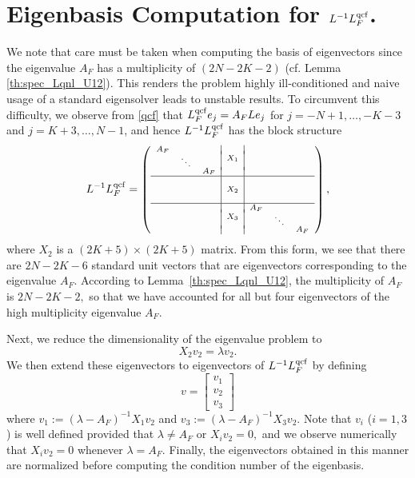 \documentclass[12pt,reqno]{amsart}
\begin{document}
\section{Eigenbasis Computation for ${{L}}^{-1} {L^{{\rm qcf}}_F}$.}
\label{app:cond_calc}
We note that care must be taken when computing the basis of
eigenvectors since the eigenvalue $A_F$ has a multiplicity of
$(2N-2K-2)$ (cf. Lemma \ref{th:spec_Lqnl_U12}). This renders the
problem highly ill-conditioned and naive usage of a standard
eigensolver leads to unstable results. To circumvent this difficulty,
we observe from \eqref{qcf} that ${L^{{\rm qcf}}_F} e_j=A_F{{L}} e_j$ for
$j=-N+1,\dots, -K-3$ and $j= K+3,\dots, N-1$, and hence
${{L}}^{-1}{L^{{\rm qcf}}_F}$ has the block structure
\begin{equation*}
    {{L}}^{-1}{L^{{\rm qcf}}_F} = {\scriptsize \left(\begin{array}{rrr|r|rrr}
    A_F &      &     & \multirow{3}{*}{${X_1}$} &     &      &   \\[-1mm]
        &\ddots&     &      &   &      &   \\[-1mm]
        &      & A_F &      &   &      &   \\
      \hline
        &      &     & \multirow{3}{*}{${X_2}$} &     &      &   \\
	&      &     &   &   &      &   \\
	&      &     &   &   &      &   \\
      \hline
        &      &     & \multirow{3}{*}{${X_3}$} & A_F &      &   \\[-1mm]
        &      &     &     &     &\ddots&   \\[-1mm]
        &      &     &     &     &      & A_F
    \end{array} \right), }
\end{equation*}
where $X_2$ is a $(2K+5) \times (2K+5)$ matrix.  From this form, we
see that there are $2N-2K-6$ standard unit vectors that are
eigenvectors corresponding to the eigenvalue $A_F.$ According to
Lemma~\ref{th:spec_Lqnl_U12}, the multiplicity of $A_F$ is $2N-2K-2,$
so that we have accounted for all but four eigenvectors of the high
multiplicity eigenvalue $A_F.$

Next, we reduce the dimensionality of the eigenvalue problem to
\begin{equation*}
  X_2 v_2 = \lambda v_2.
\end{equation*}
We then extend these eigenvectors to eigenvectors of ${{L}}^{-1} {L^{{\rm qcf}}_F}$
by defining
\begin{equation*}
  v = \left[
    \begin{array}{c}
      v_1\\
      v_2\\
      v_3
    \end{array}
  \right]
\end{equation*}
where $v_1:=(\lambda-A_F)^{-1}X_1 v_2$ and $v_3:=(\lambda-A_F)^{-1}X_3
v_2.$ Note that $v_i$ ($i=1,3$) is well defined provided that $\lambda
\neq A_F$ or $X_i v_2 = 0,$ and we observe numerically that $X_i v_2 =
0$ whenever $\lambda = A_F.$ Finally, the eigenvectors obtained in
this manner are normalized before computing the condition number of
the eigenbasis.
\end{document}
